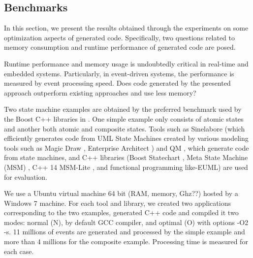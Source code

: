 \subsection{Benchmarks}
\label{subsec:exp2}
In this section, we present the results obtained through the experiments on some optimization aspects of generated code. 
Specifically, two questions related to memory consumption and runtime performance of generated code are posed. 

\noindent
{} Runtime performance and memory usage is undoubtedly critical in real-time and embedded systems. Particularly, in event-driven systems, the performance is measured by event processing speed. Does code generated by the presented approach outperform existing approaches and use less memory?



\noindent
{} Two state machine examples are obtained by the preferred benchmark used by the Boost C++ libraries \cite{boost} in \cite{benchmark}. One simple example \cite{simpleexample} only consists of atomic states and another \cite{compositeexample} both atomic and composite states. 
Tools such as Sinelabore (which efficiently generates code from UML State Machines created by various modeling tools such as Magic Draw \cite{Magicdraw}, Enterprise Architect \cite{EA}) and QM \cite{QM}, which generate code from state machines, and C++ libraries (Boost Statechart \cite{Statechart}, Meta State Machine (MSM) \cite{MSM}, C++ 14 MSM-Lite \cite{benchmark}, and functional programming like-EUML\cite{EUML}) are used for evaluation. 

\noindent
{} We use a Ubuntu virtual machine 64 bit (RAM, memory, Ghz??) hosted by a Windows 7 machine. 
For each tool and library, we created two applications corresponding to the two examples, generated C++ code and compiled it two modes: normal (N), by default GCC compiler, and optimal (O) with options -O2 -s. 
11 millions of events are generated and processed by the simple example and more than 4 millions for the composite example. 
Processing time is measured for each case. 

